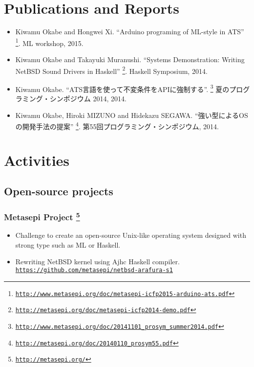 \documentclass[letterpaper]{article}
\begin{document}
\section*{Publications and Reports}

\begin{itemize}
  \item Kiwamu Okabe and Hongwei Xi. ``Arduino programing of ML-style in ATS'' \footnote{\href{http://www.metasepi.org/doc/metasepi-icfp2015-arduino-ats.pdf}{\tt http://www.metasepi.org/doc/metasepi-icfp2015-arduino-ats.pdf}}. ML workshop, 2015.
  \item Kiwamu Okabe and Takayuki Muranushi. ``Systems Demonstration: Writing NetBSD Sound Drivers in Haskell'' \footnote{\href{http://metasepi.org/doc/metasepi-icfp2014-demo.pdf}{\tt http://metasepi.org/doc/metasepi-icfp2014-demo.pdf}}. Haskell Symposium, 2014.
  \item Kiwamu Okabe. ``ATS言語を使って不変条件をAPIに強制する''. \footnote{\href{http://www.metasepi.org/doc/20141101\_prosym\_summer2014.pdf}{\tt http://www.metasepi.org/doc/20141101\_prosym\_summer2014.pdf}} 夏のプログラミング・シンポジウム 2014, 2014.
  \item Kiwamu Okabe, Hiroki MIZUNO and Hidekazu SEGAWA. ``強い型によるOSの開発手法の提案'' \footnote{\href{http://metasepi.org/doc/20140110\_prosym55.pdf}{\tt http://metasepi.org/doc/20140110\_prosym55.pdf}}. 第55回プログラミング・シンポジウム, 2014.
\end{itemize}

\section*{Activities}

\subsection*{Open-source projects}

\subsubsection*{Metasepi Project \footnote{\href{http://metasepi.org/}{\tt http://metasepi.org/}}}
\begin{itemize}
\item Challenge to create an open-source Unix-like operating system designed with strong type such as ML or Haskell.
\item Rewriting NetBSD kernel using Ajhc Haskell compiler. \href{https://github.com/metasepi/netbsd-arafura-s1}{\tt https://github.com/metasepi/netbsd-arafura-s1}
\end{itemize}
\end{document}
